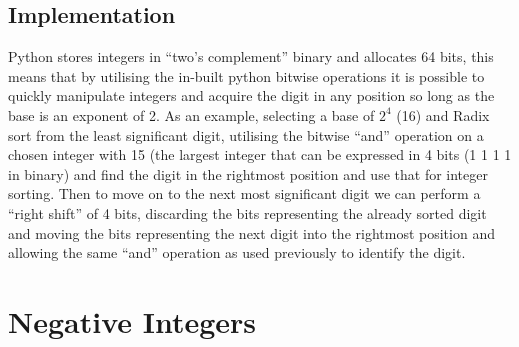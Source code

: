 \documentclass[12pt]{article}
\begin{document}
	\subsection{Implementation}
  	\label{ssec:digits}
	Python stores integers in “two’s complement” binary and allocates 64 bits, this means that by utilising the in-built python bitwise operations it is possible to quickly manipulate integers and acquire the digit in any position so long as the base is an exponent of 2.
	\newline
	As an example, selecting a base of $2^{4}$ (16) and Radix sort from the least significant digit, utilising the bitwise “and” operation on a chosen integer with 15 (the largest integer that can be expressed in 4 bits (1 1 1 1 in binary) and find the digit in the rightmost position and use that for integer sorting. Then to move on to the next most significant digit we can perform a “right shift” of 4 bits, discarding the bits representing the already sorted digit and moving the bits representing the next digit into the rightmost position and allowing the same “and” operation as used previously to identify the digit.
	\pagebreak
	\section{Negative Integers}
\end{document}
